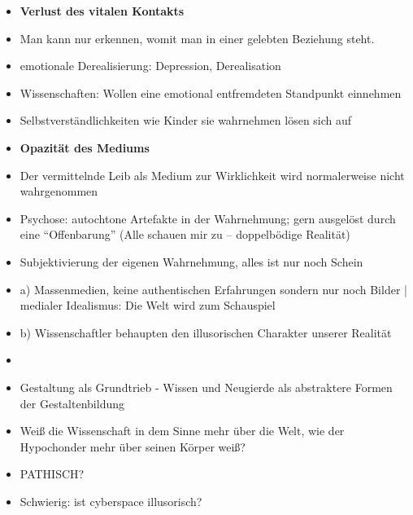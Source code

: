\documentclass[emulatestandardclasses]{scrartcl}
\begin{document}
\begin{itemize}
  \item \textbf{Verlust des vitalen Kontakts}
  \item Man kann nur erkennen, womit man in einer gelebten Beziehung steht.
  \item emotionale Derealisierung: Depression, Derealisation
  \item Wissenschaften: Wollen eine emotional entfremdeten Standpunkt einnehmen
  \item Selbstverständlichkeiten wie Kinder sie wahrnehmen lösen sich auf
  \item \textbf{Opazität des Mediums}
  \item Der vermittelnde Leib als Medium zur Wirklichkeit wird normalerweise nicht wahrgenommen
  \item Psychose: autochtone Artefakte in der Wahrnehmung; gern ausgelöst durch eine "`Offenbarung"' (Alle schauen mir zu -- doppelbödige Realität)
  \item Subjektivierung der eigenen Wahrnehmung, alles ist nur noch Schein
  \item a) Massenmedien, keine authentischen Erfahrungen sondern nur noch Bilder | medialer Idealismus: Die Welt wird zum Schauspiel
  \item b) Wissenschaftler behaupten den illusorischen Charakter unserer Realität
  \item 
\end{itemize}


\begin{itemize}
  \item Gestaltung als Grundtrieb - Wissen und Neugierde als abstraktere Formen der Gestaltenbildung
  \item Weiß die Wissenschaft in dem Sinne mehr über die Welt, wie der Hypochonder mehr über seinen Körper weiß?
  \item PATHISCH?
  \item Schwierig: ist cyberspace illusorisch?
\end{itemize}


\newpage
%


\end{document}
